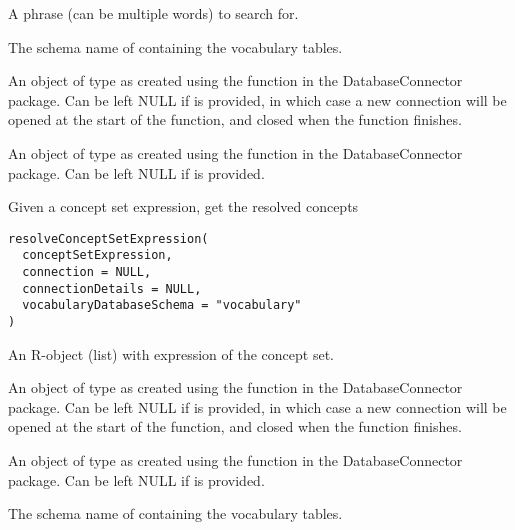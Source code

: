 \documentclass[a4paper]{book}
\begin{document}
\begin{Arguments}
\begin{ldescription}
\item[\code{searchString}] A phrase (can be multiple words) to search for.

\item[\code{vocabularyDatabaseSchema}] The schema name of containing the vocabulary tables.

\item[\code{connection}] An object of type  as created using the
 function in the
DatabaseConnector package. Can be left NULL if 
is provided, in which case a new connection will be opened at the start
of the function, and closed when the function finishes.

\item[\code{connectionDetails}] An object of type  as created using the
 function in the
DatabaseConnector package. Can be left NULL if  is
provided.
\end{ldescription}
\end{Arguments}
%
\begin{Description}\relax
Given a concept set expression, get the resolved concepts
\end{Description}
%
\begin{Usage}
\begin{verbatim}
resolveConceptSetExpression(
  conceptSetExpression,
  connection = NULL,
  connectionDetails = NULL,
  vocabularyDatabaseSchema = "vocabulary"
)
\end{verbatim}
\end{Usage}
%
\begin{Arguments}
\begin{ldescription}
\item[\code{conceptSetExpression}] An R-object (list) with expression of the concept set.

\item[\code{connection}] An object of type  as created using the
 function in the
DatabaseConnector package. Can be left NULL if 
is provided, in which case a new connection will be opened at the start
of the function, and closed when the function finishes.

\item[\code{connectionDetails}] An object of type  as created using the
 function in the
DatabaseConnector package. Can be left NULL if  is
provided.

\item[\code{vocabularyDatabaseSchema}] The schema name of containing the vocabulary tables.
\end{ldescription}
\end{Arguments}
\end{document}
